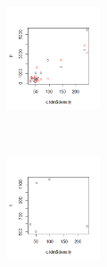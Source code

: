 \begin{figure}[t!]
    \centering
    \begin{subfigure}[t]{0.5\textwidth}
        \centering
        \includegraphics[height=1.2in]{pictures/Modell_1/repeat = 30/image_30-8/Rplot}
    \end{subfigure}%
    ~ 
    \begin{subfigure}[t]{0.5\textwidth}
        \centering
        \includegraphics[height=1.2in]{pictures/Modell_1/repeat = 30/image_30-8/Rplot01}
    \end{subfigure}
\end{figure}